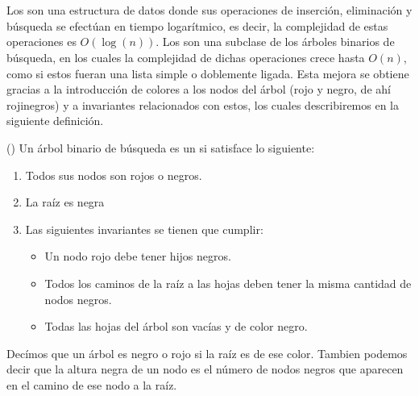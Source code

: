 \section{\Arns}
Los {\arns} son una estructura de datos donde sus operaciones de inserci\'on, eliminaci\'on y
búsqueda se efectúan en tiempo logarítmico, es decir, la complejidad de estas operaciones es
$O(\log(n))$. Los {\arns} son una subclase de los \'arboles binarios de búsqueda, en los cuales la
complejidad de dichas operaciones crece hasta $O(n)$, como si estos fueran una lista simple o
doblemente ligada. Esta mejora se obtiene gracias a la introducción de colores a los nodos del
\'arbol (rojo y negro, de ah\'i rojinegros) y a invariantes relacionados con estos, los
cuales describiremos en la siguiente definici\'on.

\begin{defn}{({\Arns})}
\label{defn_arn}
Un \'arbol binario de búsqueda es un {\arn}\cite{canekED} si satisface lo siguiente:
\begin{enumerate}
    \item Todos sus nodos son rojos o negros.
    \item La ra\'iz es negra 
    \item Las siguientes invariantes se tienen que cumplir:
    \begin{itemize}
        \item Un nodo rojo debe tener hijos negros.
        \item Todos los caminos de la raíz a las hojas deben tener la misma cantidad de nodos
        negros.
        \item Todas las hojas del \'arbol son vacías y de color negro.
    \end{itemize}
\end{enumerate}
Dec\'imos que un \'arbol es negro o rojo si la ra\'iz es de ese color. Tambien podemos decir que la
altura negra de un nodo es el n\'umero de nodos negros que aparecen en el camino de 
ese nodo a la raíz.
\end{defn}

